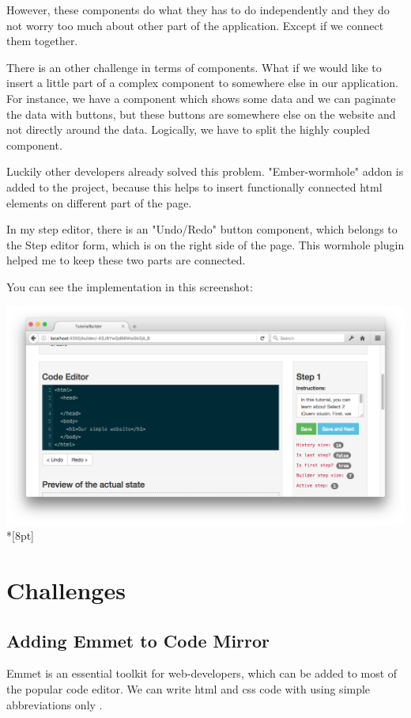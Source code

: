 \documentclass[12pt, a4paper, oneside, openright, medskipamount]{report}
\begin{document}
However, these components do what they has to do independently and they do not worry too much about other part of the application. Except if we connect them together.

There is an other challenge in terms of components. What if we would like to insert a little part of a complex component to somewhere else in our application. For instance, we have a component which shows some data and we can paginate the data with buttons, but these buttons are somewhere else on the website and not directly around the data. Logically, we have to split the highly coupled component.

Luckily other developers already solved this problem. "Ember-wormhole" addon is added to the project, because this helps to insert functionally connected html elements on different part of the page.

In my step editor, there is an "Undo/Redo" button component, which belongs to the Step editor form, which is on the right side of the page. This wormhole plugin helped me to keep these two parts are connected.

You can see the implementation in this screenshot:

\includegraphics[width=1\textwidth]{assets/wormhole-screenshot.png}\\*[8pt]

\section{Challenges}

\subsection{Adding Emmet to Code Mirror} \label{emmet}

Emmet is an essential toolkit for web-developers, which can be added to most of the popular code editor. We can write html and css code with using simple abbreviations only \cite{emmet}.
\end{document}
